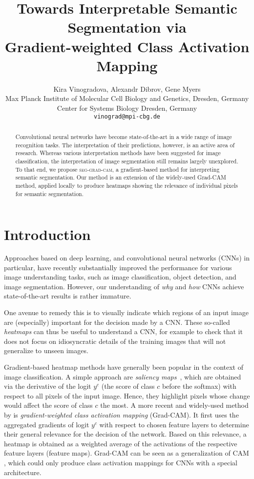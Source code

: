\documentclass[letterpaper]{article} %
\title{Towards Interpretable Semantic Segmentation via \\ 
Gradient-weighted Class Activation Mapping }
\author{%
Kira Vinogradova,
Alexandr Dibrov,
Gene Myers
\\
Max Planck Institute of Molecular Cell Biology and Genetics, Dresden, Germany\\
Center for Systems Biology Dresden, Germany\\[1mm]
\texttt{vinograd@mpi-cbg.de}
}
\newcommand{\sgc}{\mbox{\small\textsc{seg-grad-cam}}}
\begin{document}
\maketitle

\begin{abstract}
Convolutional neural networks have become state-of-the-art in a wide range of image recognition tasks. The interpretation of their predictions, however, is an active area of research. Whereas various interpretation methods have been suggested for image classification, the interpretation of image segmentation still remains largely unexplored. To that end, we propose \sgc, a gradient-based method for interpreting semantic segmentation. Our method is an extension of the widely-used Grad-CAM method, applied locally to produce heatmaps showing the relevance of individual pixels for semantic segmentation.
\end{abstract}

\section{Introduction}
\label{sec:intro}

Approaches based on deep learning, and convolutional neural networks (CNNs) in particular, have recently substantially improved the performance for various image understanding tasks, such as image classification, object detection, and image segmentation.
However, our understanding of \emph{why} and \emph{how} CNNs achieve state-of-the-art results is rather immature.

One avenue to remedy this is to visually indicate which regions of an input image are (especially) important
for the decision made by a CNN.
These so-called \emph{heatmaps} can thus be useful to understand a CNN, for example to check that it does not focus on idiosyncratic details of the training images that will not generalize to unseen images.

%
Gradient-based heatmap methods have generally been popular in the context of image classification.
A simple approach are \emph{saliency maps}~\cite{simonyan2013deep}, which are obtained via the derivative of the logit $y^c$ (the score of class $c$ before the softmax) with respect to all pixels of the input image.
Hence, they highlight pixels whose change would affect the score of class $c$ the most.
%
A more recent and widely-used method by \citeauthor{selvaraju2017grad} \citeyear{selvaraju2017grad} is \emph{gradient-weighted class activation mapping} (Grad-CAM).
It first uses the aggregated gradients of logit $y^c$ with respect to chosen feature layers to determine their general relevance for the decision of the network. Based on this relevance, a heatmap is obtained as a weighted average of the activations of the respective feature layers (feature maps).
Grad-CAM can be seen as a generalization of CAM \cite{zhou2016learning}
, which could only produce class activation mappings for CNNs with a special architecture.
%
\end{document}
